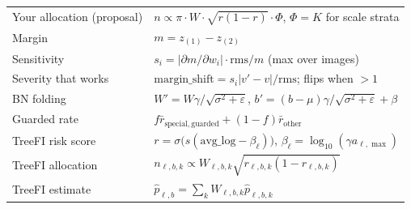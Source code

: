 \begin{center}
\begin{tabular}{@{}p{4.4cm}p{11cm}@{}}
Your allocation (proposal) & $n\propto\pi\cdot W\cdot\sqrt{r(1-r)}\cdot\Phi$, $\Phi=K$ for scale strata \\
Margin & $m=z_{(1)}-z_{(2)}$ \\
Sensitivity & $s_i=|\partial m/\partial w_i|\cdot\mathrm{rms}/m$ (max over images) \\
Severity that works & $\mathrm{margin\_shift}=s_i|v'-v|/\mathrm{rms}$; flips when $>1$ \\
BN folding & $W'=W\gamma/\sqrt{\sigma^2+\varepsilon}$, $b'=(b-\mu)\gamma/\sqrt{\sigma^2+\varepsilon}+\beta$ \\
Guarded rate & $f\bar r_{\mathrm{special,guarded}}+(1-f)\bar r_{\mathrm{other}}$ \\
TreeFI risk score & $r=\sigma\bigl(s(\mathrm{avg\_log}-\beta_\ell)\bigr)$, $\beta_\ell=\log_{10}(\gamma a_{\ell,\max})$ \\
TreeFI allocation & $n_{\ell,b,k}\propto W_{\ell,b,k}\sqrt{r_{\ell,b,k}(1-r_{\ell,b,k})}$ \\
TreeFI estimate & $\hat p_{\ell,b}=\sum_kW_{\ell,b,k}\hat p_{\ell,b,k}$ \\
\bottomrule
\end{tabular}
\end{center}
\renewcommand{\arraystretch}{1.15}

